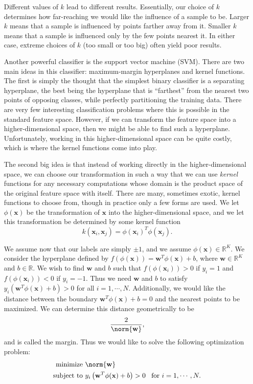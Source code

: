 Different values of $k$ lead to different results. 
Essentially, our choice of $k$ determines how far-reaching we would like the influence of a sample to be. 
Larger $k$ means that a sample is influenced by points farther away from it. 
Smaller $k$ means that a sample is influenced only by the few points nearest it. 
In either case, extreme choices of $k$ (too small or too big) often yield poor results.

Another powerful classifier is the support vector machine (SVM). 
There are two main ideas in this classifier: maximum-margin hyperplanes and kernel functions. 
The first is simply the thought that the simplest binary classifier is a separating hyperplane, 
the best being the hyperplane that is ``farthest'' from the nearest two points of opposing classes, 
while perfectly partitioning the training data. 
There are very few interesting classification problems where this is possible in the standard feature space. 
However, if we can transform the feature space into a higher-dimensional space, 
then we might be able to find such a hyperplane. Unfortunately, working in this higher-dimensional space can be quite costly,
which is where the kernel functions come into play.

The second big idea is that instead of working directly in the higher-dimensional space, 
we can choose our transformation in such a way that we can use \emph{kernel} functions for any 
necessary computations whose domain is the product space of the original feature space with itself. 
There are many, sometimes exotic, kernel functions to choose from, though in practice only a few forms are used. 
We let $\phi(\mathbf{x})$ be the transformation of $\mathbf{x}$ into the higher-dimensional space, 
and we let this transformation be determined by some kernel function 
\begin{equation*}
k(\mathbf{x}_{i},\mathbf{x}_{j}) = \phi(\mathbf{x}_{i})^{T}\phi(\mathbf{x}_{j}).
\end{equation*}

We assume now that our labels are simply $\pm 1$, and we assume $\phi(\mathbf{x}) \in \mathbb{R}^{K}$. 
We consider the hyperplane defined by $f(\phi(\mathbf{x})) = \mathbf{w}^{T}\phi(\mathbf{x}) + b$, 
where $\mathbf{w} \in \mathbb{R}^{K}$ and $b \in \mathbb{R}$. 
We wish to find $\mathbf{w}$ and $b$ such that 
$f(\phi(\mathbf{x}_{i})) > 0$ if $y_{i} = 1$ and 
$f(\phi(\mathbf{x}_{i})) < 0$ if $y_{i} = -1$. 
Thus we need $\mathbf{w}$ and $b$ to satisfy $y_{i}\left( \mathbf{w}^{T}\phi(\mathbf{x}) + b\right) > 0$ 
for all $i = 1, \cdots, N$. Additionally, we would like the distance between the boundary 
$\mathbf{w}^{T}\phi(\mathbf{x}) + b = 0$ and the nearest points to be maximized. 
We can determine this distance geometrically to be 
\begin{equation*}
\frac{2}{\norm{\mathbf{w}}},
\end{equation*}
and is called the margin. Thus we would like to solve the following optimization problem:
\begin{align*}
\text{minimize } & \norm{\mathbf{w}} \\
\text{subject to } & y_{i}\left(\mathbf{w}^{T}\phi(\mathbf{x}) + b\right) > 0 \; \; \; \text{for } i = 1, \cdots, N.
\end{align*}

